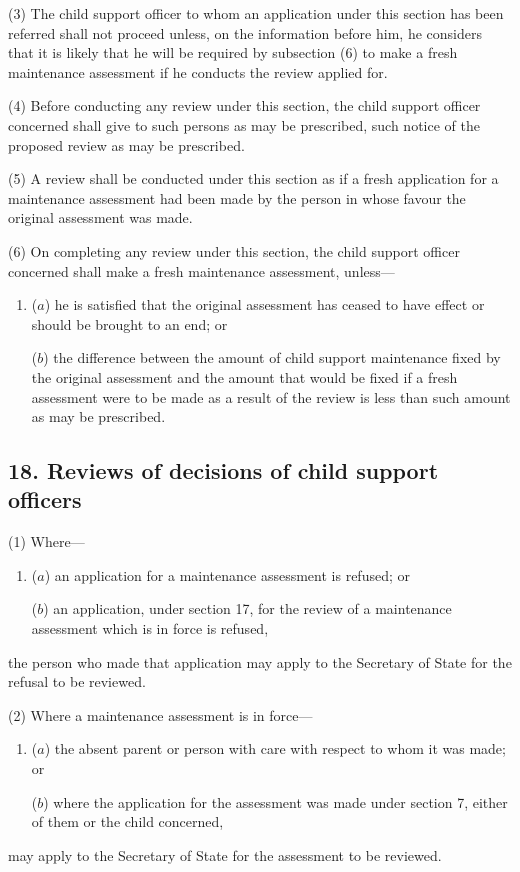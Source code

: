 \documentclass[12pt,a4paper]{article}
\begin{document}
(3) The child support officer to whom an application under this section has been referred shall not proceed unless, on the information before him, he considers that it is likely that he will be required by subsection (6)  to make a fresh maintenance assessment if he conducts the review applied for.

(4) Before conducting any review under this section, the child support officer concerned shall give to such persons as may be prescribed, such notice of the proposed review as may be prescribed.

(5) A review shall be conducted under this section as if a fresh application for a maintenance assessment had been made by the person in whose favour the original assessment was made.

(6) On completing any review under this section, the child support officer concerned shall make a fresh maintenance assessment, unless—
\begin{enumerate}\item[]
($a$) he is satisfied that the original assessment has ceased to have effect or should be brought to an end; or

($b$) the difference between the amount of child support maintenance fixed by the original assessment and the amount that would be fixed if a fresh assessment were to be made as a result of the review is less than such amount as may be prescribed.
\end{enumerate}


\subsection{18. Reviews of decisions of child support officers}

(1) Where—
\begin{enumerate}\item[]
($a$) an application for a maintenance assessment is refused; or

($b$) an application, under section 17, for the review of a maintenance assessment which is in force is refused,
\end{enumerate}
the person who made that application may apply to the Secretary of State for the refusal to be reviewed.

(2) Where a maintenance assessment is in force—
\begin{enumerate}\item[]
($a$) the absent parent or person with care with respect to whom it was made; or

($b$) where the application for the assessment was made under section 7, either of them or the child concerned,
\end{enumerate}
may apply to the Secretary of State for the assessment to be reviewed.
\end{document}
